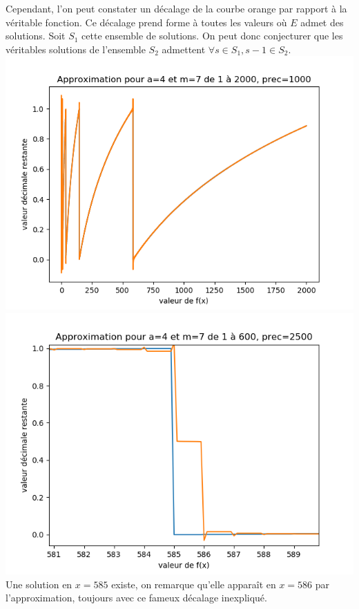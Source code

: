 \documentclass{article}
\begin{document}
Cependant, l'on peut constater un décalage de la courbe orange par rapport à la véritable fonction. Ce décalage prend forme à toutes les valeurs où $E$ admet des solutions. Soit $S_1$ cette ensemble de solutions. On peut donc conjecturer que les véritables solutions de l'ensemble $S_2$ admettent $\forall s \in S_1, s - 1 \in S_2$.\\
\includegraphics[scale=0.70]{images/Figure_7.png}\\
\includegraphics[scale=0.70]{images/Figure_8.png}\\
Une solution en $x=585$ existe, on remarque qu'elle apparaît en $x=586$ par l'approximation, toujours avec ce fameux décalage inexpliqué.
\end{document}
